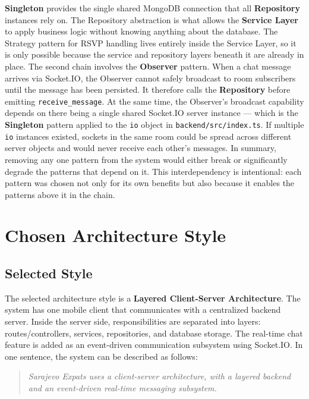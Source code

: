 \documentclass[12pt,a4paper]{article}
\begin{document}
\textbf{Singleton} provides the single shared MongoDB connection that all
\textbf{Repository} instances rely on. The Repository abstraction is what allows the
\textbf{Service Layer} to apply business logic without knowing anything about the
database. The Strategy pattern for RSVP handling lives entirely inside the Service
Layer, so it is only possible because the service and repository layers beneath it are
already in place.
The second chain involves the \textbf{Observer} pattern. When a chat message arrives
via Socket.IO, the Observer cannot safely broadcast to room subscribers until the message
has been persisted. It therefore calls the \textbf{Repository} before emitting
\texttt{receive\_message}. At the same time, the Observer's broadcast capability depends
on there being a single shared Socket.IO server instance --- which is the \textbf{Singleton}
pattern applied to the \texttt{io} object in \texttt{backend/src/index.ts}. If multiple
\texttt{io} instances existed, sockets in the same room could be spread across different
server objects and would never receive each other's messages.
In summary, removing any one pattern from the system would either break or significantly
degrade the patterns that depend on it. This interdependency is intentional: each pattern
was chosen not only for its own benefits but also because it enables the patterns above
it in the chain.
\section{Chosen Architecture Style}
\subsection{Selected Style}
The selected architecture style is a \textbf{Layered Client-Server Architecture}.
The system has one mobile client that communicates with a centralized backend server.
Inside the server side, responsibilities are separated into layers: routes/controllers,
services, repositories, and database storage. The real-time chat feature is added as an
event-driven communication subsystem using Socket.IO.
In one sentence, the system can be described as follows:
\begin{quote}
\textit{Sarajevo Expats uses a client-server architecture, with a layered backend and an
event-driven real-time messaging subsystem.}
\end{quote}
\end{document}
